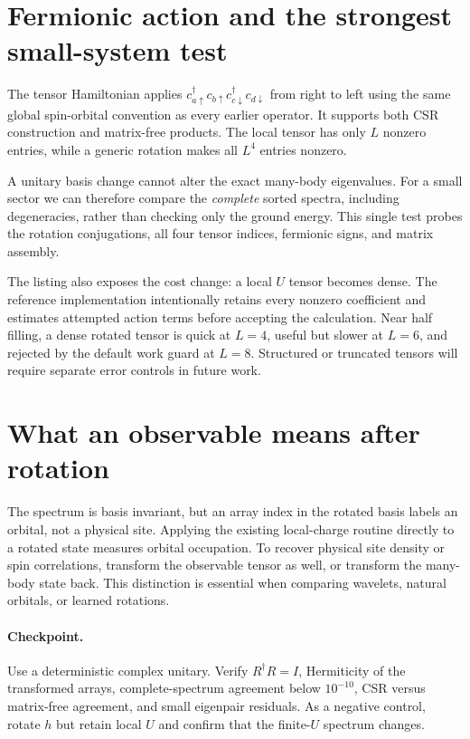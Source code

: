 \section{Fermionic action and the strongest small-system test}

The tensor Hamiltonian applies
$c_{a\uparrow}^\dagger c_{b\uparrow}
 c_{c\downarrow}^\dagger c_{d\downarrow}$ from right to left using the same
global spin-orbital convention as every earlier operator.  It supports both
CSR construction and matrix-free products.  The local tensor has only $L$
nonzero entries, while a generic rotation makes all $L^4$ entries nonzero.

A unitary basis change cannot alter the exact many-body eigenvalues.  For a
small sector we can therefore compare the \emph{complete} sorted spectra,
including degeneracies, rather than checking only the ground energy.  This
single test probes the rotation conjugations, all four tensor indices,
fermionic signs, and matrix assembly.



The listing also exposes the cost change: a local $U$ tensor becomes dense.
The reference implementation intentionally retains every nonzero coefficient
and estimates attempted action terms before accepting the calculation.  Near
half filling, a dense rotated tensor is quick at $L=4$, useful but slower at
$L=6$, and rejected by the default work guard at $L=8$.  Structured or
truncated tensors will require separate error controls in future work.

\section{What an observable means after rotation}

The spectrum is basis invariant, but an array index in the rotated basis labels
an orbital, not a physical site.  Applying the existing local-charge routine
directly to a rotated state measures orbital occupation.  To recover physical
site density or spin correlations, transform the observable tensor as well, or
transform the many-body state back.  This distinction is essential when
comparing wavelets, natural orbitals, or learned rotations.

\paragraph{Checkpoint.}
Use a deterministic complex unitary.  Verify $R^\dagger R=I$, Hermiticity of
the transformed arrays, complete-spectrum agreement below $10^{-10}$, CSR
versus matrix-free agreement, and small eigenpair residuals.  As a negative
control, rotate $h$ but retain local $U$ and confirm that the finite-$U$
spectrum changes.
